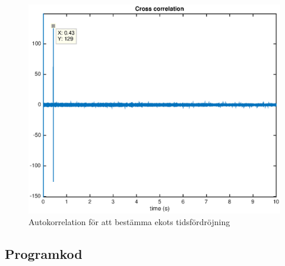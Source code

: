 \documentclass[10pt]{article}
\begin{document}
\begin{figure}
  \centering
  \includegraphics[scale=0.55]{figurer/xcorr.eps}
  \caption{Autokorrelation för att bestämma ekots tidsfördröjning}
  \label{xcorr}
\end{figure}

\clearpage

\begin{multicols}{2}
\begin{appendices}
\section{Programkod}

\end{appendices}
\end{multicols}
\end{document}
